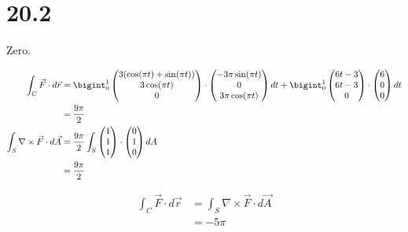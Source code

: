 \documentclass[8pt]{extarticle}
\begin{document}
  \section{20.2}%
  \begin{description}[font=\normalfont]
    \item[2:] Zero.
    \item[4:]
      \begin{align*}
        \int_{C}\vec{F} \cdot d\vec{r} &= \bigint_{0}^{1} \begin{pmatrix}3(\cos(\pi t) + \sin(\pi t))\\3\cos(\pi t)\\0\end{pmatrix}\cdot\begin{pmatrix}-3\pi\sin(\pi t)\\0\\3\pi\cos(\pi t)\end{pmatrix} dt + \bigint_{0}^{1} \begin{pmatrix}6t-3\\6t-3\\0\end{pmatrix}\cdot \begin{pmatrix}6\\0\\0\end{pmatrix}dt\\
                                       &= \frac{9\pi}{2}\\
        \int_{S}\nabla\times\vec{F}\cdot d\vec{A} &= \frac{9\pi}{2}\int_{S} \begin{pmatrix}1\\1\\1\end{pmatrix} \cdot \begin{pmatrix}0\\1\\0\end{pmatrix}dA\\
                                                  &= \frac{9\pi}{2}
      \end{align*}
    \item[10:]
      \begin{align*}
        \int_{C} \vec{F} \cdot d\vec{r} &= \int_{S}\nabla\times\vec{F}\cdot d\vec{A}\\
                                        &= -5\pi
      \end{align*}
    \item[12:]
      \begin{align*}

\end{align*}
\end{description}
\end{document}
